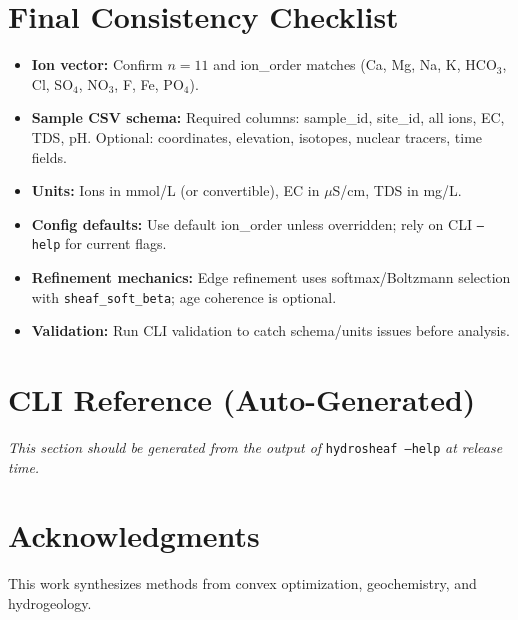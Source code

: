 \documentclass[12pt,a4paper]{article}
\theoremstyle{plain}
\theoremstyle{definition}
\theoremstyle{remark}
\begin{document}
\section*{Final Consistency Checklist}
\begin{itemize}
	\item \textbf{Ion vector:} Confirm $n=11$ and ion\_order matches (Ca, Mg, Na, K, HCO$_3$, Cl, SO$_4$, NO$_3$, F, Fe, PO$_4$).
	\item \textbf{Sample CSV schema:} Required columns: sample\_id, site\_id, all ions, EC, TDS, pH. Optional: coordinates, elevation, isotopes, nuclear tracers, time fields.
	\item \textbf{Units:} Ions in mmol/L (or convertible), EC in $\mu$S/cm, TDS in mg/L.
	\item \textbf{Config defaults:} Use default ion\_order unless overridden; rely on CLI \texttt{--help} for current flags.
	\item \textbf{Refinement mechanics:} Edge refinement uses softmax/Boltzmann selection with \texttt{sheaf\_soft\_beta}; age coherence is optional.
	\item \textbf{Validation:} Run CLI validation to catch schema/units issues before analysis.
\end{itemize}

\section{CLI Reference (Auto-Generated)}\label{sec:cli_appendix}
\textit{This section should be generated from the output of}\newline
\texttt{hydrosheaf --help}\newline
\textit{at release time.}



\section*{Acknowledgments}
This work synthesizes methods from convex optimization, geochemistry, and hydrogeology.
\end{document}
